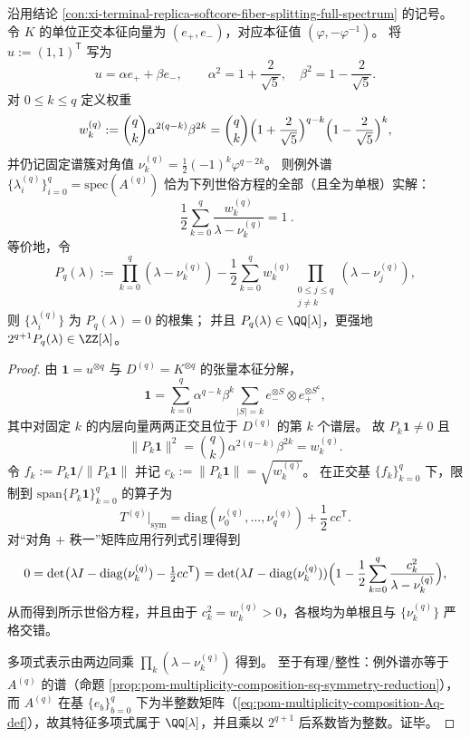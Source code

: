 \begin{conclusion}\label{con:xi-terminal-replica-softcore-exceptional-secular-stieltjes}
沿用结论 \ref{con:xi-terminal-replica-softcore-fiber-splitting-full-spectrum} 的记号。
令 \(K\) 的单位正交本征向量为 \((e_+,e_-)\)，对应本征值 \((\varphi,-\varphi^{-1})\)。
将 \(u:=(1,1)^{\mathsf T}\) 写为
\[
u=\alpha e_+ + \beta e_-,
\qquad
\alpha^2=1+\frac{2}{\sqrt5},\quad \beta^2=1-\frac{2}{\sqrt5}.
\]
对 \(0\le k\le q\) 定义权重
\[
w_k^{(q)}:=\binom{q}{k}\alpha^{2(q-k)}\beta^{2k}
=\binom{q}{k}\Bigl(1+\frac{2}{\sqrt5}\Bigr)^{q-k}\Bigl(1-\frac{2}{\sqrt5}\Bigr)^{k},
\]
并仍记固定谱簇对角值 \(\nu_k^{(q)}=\frac12(-1)^k\varphi^{q-2k}\)。
则例外谱 \(\{\lambda_i^{(q)}\}_{i=0}^{q}=\mathrm{spec}(A^{(q)})\) 恰为下列世俗方程的全部（且全为单根）实解：
\[
\boxed{\ \frac12\sum_{k=0}^{q}\frac{w_k^{(q)}}{\lambda-\nu_k^{(q)}}=1\ }.
\]
等价地，令
\[
P_q(\lambda)
:=\prod_{k=0}^{q}(\lambda-\nu_k^{(q)})
-\frac12\sum_{k=0}^{q}w_k^{(q)}\prod_{\substack{0\le j\le q\\ j\ne k}}(\lambda-\nu_j^{(q)}),
\]
则 \(\{\lambda_i^{(q)}\}\) 为 \(P_q(\lambda)=0\) 的根集；
并且 \(P_q(\lambda)\in\QQ[\lambda]\)，更强地 \(2^{q+1}P_q(\lambda)\in\ZZ[\lambda]\)。
\end{conclusion}
\begin{proof}
由 \(\mathbf{1}=u^{\otimes q}\) 与 \(D^{(q)}=K^{\otimes q}\) 的张量本征分解，
\[
\mathbf{1}
=\sum_{k=0}^{q}\alpha^{q-k}\beta^k\sum_{|S|=k}e_-^{\otimes S}\otimes e_+^{\otimes S^{\mathsf c}},
\]
其中对固定 \(k\) 的内层向量两两正交且位于 \(D^{(q)}\) 的第 \(k\) 个谱层。
故 \(P_k\mathbf{1}\neq 0\) 且
\[
\|P_k\mathbf{1}\|^2
=\binom{q}{k}\alpha^{2(q-k)}\beta^{2k}
=w_k^{(q)}.
\]
令 \(f_k:=P_k\mathbf{1}/\|P_k\mathbf{1}\|\) 并记 \(c_k:=\|P_k\mathbf{1}\|=\sqrt{w_k^{(q)}}\)。
在正交基 \(\{f_k\}_{k=0}^{q}\) 下，限制到 \(\mathrm{span}\{P_k\mathbf{1}\}_{k=0}^{q}\) 的算子为
\[
T^{(q)}\big|_{\mathrm{sym}}
=\mathrm{diag}(\nu_0^{(q)},\dots,\nu_q^{(q)})+\frac12\,cc^{\mathsf T}.
\]
对“对角 \(+\) 秩一”矩阵应用行列式引理得到
\[
0=\det\bigl(\lambda I-\mathrm{diag}(\nu_k^{(q)})-\tfrac12cc^{\mathsf T}\bigr)
=\det(\lambda I-\mathrm{diag}(\nu_k^{(q)}))
\Bigl(1-\frac12\sum_{k=0}^{q}\frac{c_k^2}{\lambda-\nu_k^{(q)}}\Bigr),
\]
从而得到所示世俗方程，并且由于 \(c_k^2=w_k^{(q)}>0\)，各根均为单根且与 \(\{\nu_k^{(q)}\}\) 严格交错。
\par
多项式表示由两边同乘 \(\prod_{k}(\lambda-\nu_k^{(q)})\) 得到。
至于有理/整性：例外谱亦等于 \(A^{(q)}\) 的谱（命题 \ref{prop:pom-multiplicity-composition-sq-symmetry-reduction}），而 \(A^{(q)}\) 在基 \(\{e_b\}_{b=0}^{q}\) 下为半整数矩阵（\eqref{eq:pom-multiplicity-composition-Aq-def}），故其特征多项式属于 \(\QQ[\lambda]\)，并且乘以 \(2^{q+1}\) 后系数皆为整数。证毕。
\end{proof}

